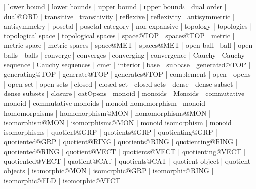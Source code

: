     |   lower bound
    |   lower bounds
    |   upper bound
    |   upper bounds
    |   dual order
    |   dual@ORD
    |   transitive
    |   transitivity
    |   reflexive
    |   reflexivity
    |   antisymmetric
    |   antisymmetry
    |   posetal
    |   posetal category
    |   non-expansive
    |   topology
    |   topologies
    |   topological space
    |   topological spaces
    |   space@TOP
    |   spaces@TOP
    |   metric
    |   metric space
    |   metric spaces
    |   space@MET
    |   spaces@MET
    |   open ball
    |   ball
    |   open balls
    |   balls
    |   converge
    |   converges
    |   converging
    |   convergence
    |   Cauchy
    |   Cauchy sequence
    |   Cauchy sequences
    |   cmet
    |   interior
    |   base
    |   subbase
    |   generated@TOP
    |   generating@TOP
    |   generate@TOP
    |   generates@TOP
    |   complement
    |   open
    |   opens
    |   open set
    |   open sets
    |   closed
    |   closed set
    |   closed sets
    |   dense
    |   dense subset
    |   dense subsets
    |   closure
    |   catOpens
    |   monoid
    |   monoids
    |   Monoids
    |   commutative monoid
    |   commutative monoids
    |   monoid homomorphism
    |   monoid homomorphisms
    |   homomorphism@MON
    |   homomorphisms@MON
    |   isomorphism@MON
    |   isomorphisms@MON
    |   monoid isomorphism
    |   monoid isomorphisms
    |   quotient@GRP
    |   quotients@GRP
    |   quotienting@GRP
    |   quotiented@GRP
    |   quotient@RING
    |   quotients@RING
    |   quotienting@RING
    |   quotiented@RING
    |   quotient@VECT
    |   quotients@VECT
    |   quotienting@VECT
    |   quotiented@VECT
    |   quotient@CAT
    |   quotients@CAT
    |   quotient object
    |   quotient objects
    |   isomorphic@MON
    |   isomorphic@GRP
    |   isomorphic@RING
    |   isomorphic@FLD
    |   isomorphic@VECT
